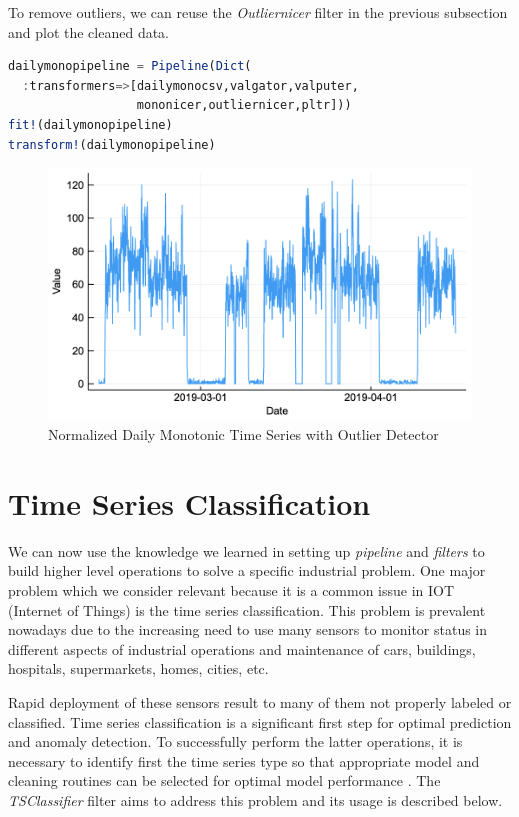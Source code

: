 \documentclass{juliacon}
\begin{document}
To remove outliers, we can reuse the \emph{Outliernicer} filter in the previous subsection and plot the cleaned data.

\begin{lstlisting}[language = Julia]
dailymonopipeline = Pipeline(Dict(
  :transformers=>[dailymonocsv,valgator,valputer,
                  mononicer,outliernicer,pltr]))
fit!(dailymonopipeline)
transform!(dailymonopipeline)
\end{lstlisting}

\begin{figure}[htbp]
   \centering
   \includegraphics[width=\columnwidth]{outnormdailymono.png}  %
   \caption{Normalized Daily Monotonic Time Series with Outlier Detector}
   \label{fig:outndailymono}
\end{figure}


\section{Time Series Classification}

We can now use the knowledge we learned in setting up 
\emph{pipeline} and \emph{filters} to build higher level
operations to solve a specific industrial problem. One major problem
which we consider relevant because it is a common issue in IOT (Internet of Things) 
 is the time series classification. This problem is prevalent nowadays 
due to the increasing need to use many sensors to monitor status in different aspects of industrial
operations and maintenance of cars, buildings, hospitals, supermarkets, homes, cities, etc.

Rapid deployment of these sensors result to many of them not properly labeled or classified.
Time series classification is a significant first step for optimal prediction and anomaly detection.
To successfully perform the latter operations, it is necessary to identify first the time series
type so that appropriate model and cleaning routines can be selected for optimal model performance . 
The  \emph{TSClassifier} filter aims to address this problem and its usage is described below.
\end{document}
